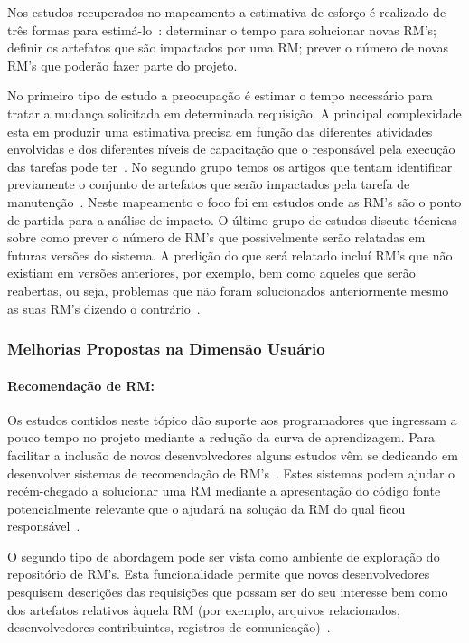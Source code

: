 Nos estudos recuperados no mapeamento a estimativa de esforço é realizado de
três formas para estimá-lo~\cite{cavalcanti2014challenges}: determinar o tempo
para solucionar novas RM's; definir os artefatos que são impactados por uma
RM\@; prever o número de novas RM's que poderão fazer parte do projeto.

No primeiro tipo de estudo a preocupação é estimar o tempo necessário para
tratar a mudança solicitada em determinada requisição. A principal complexidade
esta em produzir uma estimativa precisa em função das diferentes atividades
envolvidas e dos diferentes níveis de capacitação que o responsável pela
execução das tarefas pode ter~\cite{xia2015automatic}. No segundo grupo temos os
artigos que tentam identificar previamente o conjunto de artefatos que serão
impactados pela tarefa de manutenção~\cite{Nagwani2010}.  Neste mapeamento o
foco foi em estudos onde as RM's são o ponto de partida para a análise de
impacto. O último grupo de estudos discute técnicas sobre como prever o número
de RM's que possivelmente serão relatadas em futuras versões do sistema. A
predição do que será relatado incluí RM's que não existiam em versões
anteriores, por exemplo, bem como aqueles que serão reabertas, ou seja,
problemas que não foram solucionados anteriormente mesmo as suas RM's dizendo o
contrário~\cite{xia2015automatic}.

\subsubsection{Melhorias Propostas na Dimensão Usuário}
\label{ssub:melhorias_dim_usuario}

\paragraph{Recomendação de RM:} Os estudos contidos neste tópico dão suporte aos
programadores que ingressam a pouco tempo no projeto mediante a redução da curva
de aprendizagem. Para facilitar a inclusão de novos desenvolvedores alguns
estudos vêm se dedicando em desenvolver sistemas de recomendação de
RM's~\cite{malheiros2012source, Wang2011bug}. Estes sistemas podem ajudar o
recém-chegado a solucionar uma RM mediante a apresentação do código fonte
potencialmente relevante que o ajudará na solução da RM do qual ficou
responsável~\cite{malheiros2012source}.

O segundo tipo de abordagem pode ser vista como ambiente de exploração do
repositório de RM's. Esta funcionalidade permite que novos desenvolvedores
pesquisem descrições das requisições que possam ser do seu interesse bem como
dos artefatos relativos àquela RM (por exemplo, arquivos relacionados,
desenvolvedores contribuintes, registros de comunicação)~\cite{Wang2011bug}.

